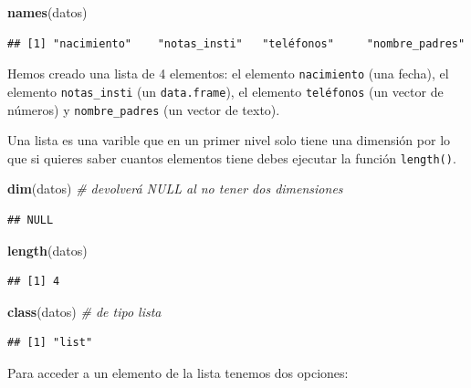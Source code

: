 \documentclass[11pt,]{book}
\newenvironment{Shaded}{\begin{snugshade}}{\end{snugshade}}
\newcommand{\CommentTok}[1]{\textcolor[rgb]{0.37,0.37,0.37}{\textit{#1}}}
\newcommand{\KeywordTok}[1]{\textcolor[rgb]{0.27,0.27,0.27}{\textbf{#1}}}
\newcommand{\NormalTok}[1]{#1}
\begin{document}
\begin{Shaded}
\begin{Highlighting}[]
\KeywordTok{names}\NormalTok{(datos)}
\end{Highlighting}
\end{Shaded}

\begin{verbatim}
## [1] "nacimiento"    "notas_insti"   "teléfonos"     "nombre_padres"
\end{verbatim}

Hemos creado una lista de 4 elementos: el elemento \texttt{nacimiento} (una fecha), el elemento \texttt{notas\_insti} (un \texttt{data.frame}), el elemento \texttt{teléfonos} (un vector de números) y \texttt{nombre\_padres} (un vector de texto).

Una lista es una varible que en un primer nivel solo tiene una dimensión por lo que si quieres saber cuantos elementos tiene debes ejecutar la función \texttt{length()}.

\begin{Shaded}
\begin{Highlighting}[]
\KeywordTok{dim}\NormalTok{(datos) }\CommentTok{# devolverá NULL al no tener dos dimensiones}
\end{Highlighting}
\end{Shaded}

\begin{verbatim}
## NULL
\end{verbatim}

\begin{Shaded}
\begin{Highlighting}[]
\KeywordTok{length}\NormalTok{(datos)}
\end{Highlighting}
\end{Shaded}

\begin{verbatim}
## [1] 4
\end{verbatim}

\begin{Shaded}
\begin{Highlighting}[]
\KeywordTok{class}\NormalTok{(datos) }\CommentTok{# de tipo lista}
\end{Highlighting}
\end{Shaded}

\begin{verbatim}
## [1] "list"
\end{verbatim}

Para acceder a un elemento de la lista tenemos dos opciones:
\end{document}
